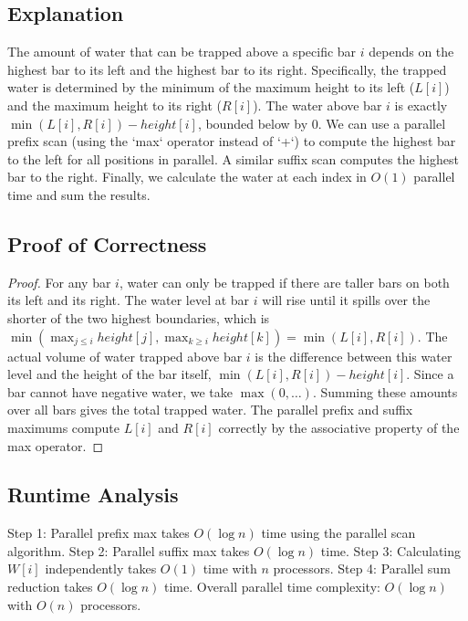 \documentclass{article}
\begin{document}
\subsection{Explanation}
The amount of water that can be trapped above a specific bar $i$ depends on the highest bar to its left and the highest bar to its right. Specifically, the trapped water is determined by the minimum of the maximum height to its left ($L[i]$) and the maximum height to its right ($R[i]$). The water above bar $i$ is exactly $\min(L[i], R[i]) - height[i]$, bounded below by 0.
We can use a parallel prefix scan (using the `max` operator instead of `+`) to compute the highest bar to the left for all positions in parallel. A similar suffix scan computes the highest bar to the right. Finally, we calculate the water at each index in $O(1)$ parallel time and sum the results.

\subsection{Proof of Correctness}
\begin{proof}
For any bar $i$, water can only be trapped if there are taller bars on both its left and its right. The water level at bar $i$ will rise until it spills over the shorter of the two highest boundaries, which is $\min(\max_{j \le i} height[j], \max_{k \ge i} height[k]) = \min(L[i], R[i])$. The actual volume of water trapped above bar $i$ is the difference between this water level and the height of the bar itself, $\min(L[i], R[i]) - height[i]$. Since a bar cannot have negative water, we take $\max(0, \dots)$. Summing these amounts over all bars gives the total trapped water. The parallel prefix and suffix maximums compute $L[i]$ and $R[i]$ correctly by the associative property of the max operator.
\end{proof}

\subsection{Runtime Analysis}
Step 1: Parallel prefix max takes $O(\log n)$ time using the parallel scan algorithm.
Step 2: Parallel suffix max takes $O(\log n)$ time.
Step 3: Calculating $W[i]$ independently takes $O(1)$ time with $n$ processors.
Step 4: Parallel sum reduction takes $O(\log n)$ time.
Overall parallel time complexity: $O(\log n)$ with $O(n)$ processors.
\end{document}
